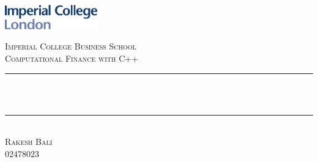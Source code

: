 \begin{titlepage}

\newcommand{\HRule}{\rule{\linewidth}{0.5mm}} %



\includegraphics[width = 4cm]{./figures/imperial}\\[0.5cm] 

\center %


\textsc{\Large Imperial College Business School}\\[0.5cm] 
\textsc{\large Computational Finance with C++}\\[0.5cm] 



\HRule \\[0.4cm]
{ \huge \bfseries \reporttitle}\\ %
\HRule \\[1.5cm]
 

\textsc{\large Rakesh Bali}\\[0.5cm] 
\textsc{\large 02478023}\\[0.5cm] 




\end{titlepage}
